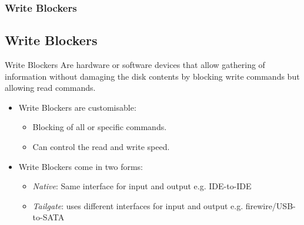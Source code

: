 \documentclass{beamer}
\begin{document}
\begin{frame}
	\frametitle{Write Blockers}
	\subsection*{Write Blockers}
	\begin{block}{Write Blockers}
			Are hardware or software devices that allow gathering of information without damaging the disk contents by blocking write commands but allowing read commands.
	\end{block}
	\begin{itemize}
		\item Write Blockers are customisable:
			\begin{itemize}
				\item Blocking of all or specific commands.
				\item Can control the read and write speed.
			\end{itemize}
		\item Write Blockers come in two forms:
			\begin{itemize}
				\item \emph{Native}: Same interface for input and output e.g. IDE-to-IDE
				\item \emph{Tailgate}: uses different interfaces for input and output e.g. firewire/USB-to-SATA
			\end{itemize}
		\end{itemize}
\end{frame}
\end{document}

